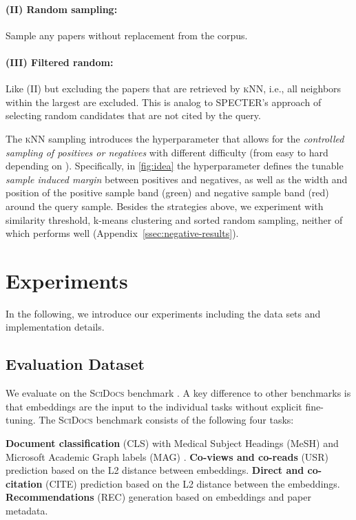 \documentclass[11pt]{article}
\newcommand{\dataset}{\textsc{SciDocs}\xspace}
\newcommand{\knn}{\textsc{kNN}\xspace}
\begin{document}
\paragraph{(II) Random sampling:} 
Sample any  papers without replacement from the corpus. 

\paragraph{(III) Filtered random:} 
Like (II) but excluding the papers that are retrieved by \knn, i.e., all neighbors within the largest  are excluded.
This is analog to SPECTER's approach of selecting random candidates that are not cited by the query. 

\vspace{0.25cm}
The \knn sampling introduces the hyperparameter  that allows for the \emph{controlled sampling of positives or negatives} with different difficulty (from easy to hard depending on ).
Specifically, in \cref{fig:idea} the hyperparameter  defines the tunable \emph{sample induced margin} between positives and negatives, as well as the width and position of the positive sample band (green) and negative sample band (red) around the query sample.
Besides the strategies above, we experiment with similarity threshold, k-means clustering and sorted random sampling, neither of which performs well (Appendix~\ref{ssec:negative-results}).

\section{Experiments} \label{sec:experiments}

In the following, we introduce our experiments including the data sets and implementation details.

\subsection{Evaluation Dataset}

We evaluate on the \dataset benchmark \cite{Cohan2020}.
A key difference to other benchmarks is that embeddings are the input to the individual tasks without explicit fine-tuning.
The \dataset benchmark consists of the following four tasks:

\textbf{Document classification} (CLS) with Medical Subject Headings (MeSH) \cite{Lipscomb2000MedicalSH} and Microsoft Academic Graph labels (MAG) \cite{Sinha2015AnOO}. \textbf{Co-views and co-reads} (USR) prediction based on the L2 distance between embeddings. 
\textbf{Direct and co-citation} (CITE) prediction based on the L2 distance between the embeddings.
\textbf{Recommendations} (REC) generation based on embeddings and paper metadata. 
\end{document}
